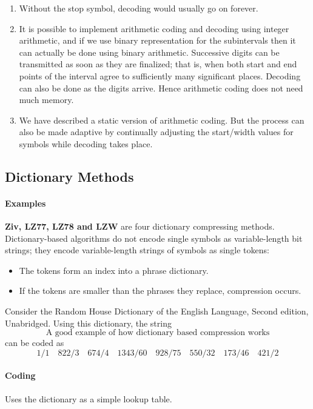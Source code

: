 \documentclass{article}
\begin{document}
\begin{enumerate}
    \item Without the stop symbol, decoding would usually go on forever.
    \item It is possible to implement arithmetic coding and decoding using integer arithmetic, and if we use binary representation for the subintervals then it can actually be done using binary arithmetic.  Successive digits can be transmitted as soon as they are finalized; that is, when both start and end points of the interval agree to sufficiently many significant places.  Decoding can also be done as the digits arrive.  Hence arithmetic coding does not need much memory.
    \item We have described a static version of arithmetic coding.  But the process can also be made adaptive by continually adjusting the start/width values for symbols while decoding takes place.
\end{enumerate}    

\subsection{Dictionary Methods}

\paragraph{Examples} \textbf{Ziv, LZ77, LZ78 and LZW} are four dictionary compressing methods.
Dictionary-based algorithms do not encode single symbols as variable-length bit strings; they encode variable-length strings of symbols as single tokens:

\begin{itemize}
    \item The tokens form an index into a phrase dictionary.
    \item If the tokens are smaller than the phrases they replace, compression occurs.
\end{itemize}

Consider the Random House Dictionary of the English Language, Second edition, Unabridged. Using this dictionary, the string
    \[\text{A good example of how dictionary based compression works}\]
can be coded as
    \[1/1 \quad 822/3 \quad 674/4 \quad 1343/60 \quad 928/75 \quad 550/32 \quad 173/46 \quad 421/2\]

\paragraph{Coding} Uses the dictionary as a simple lookup table.
\end{document}
